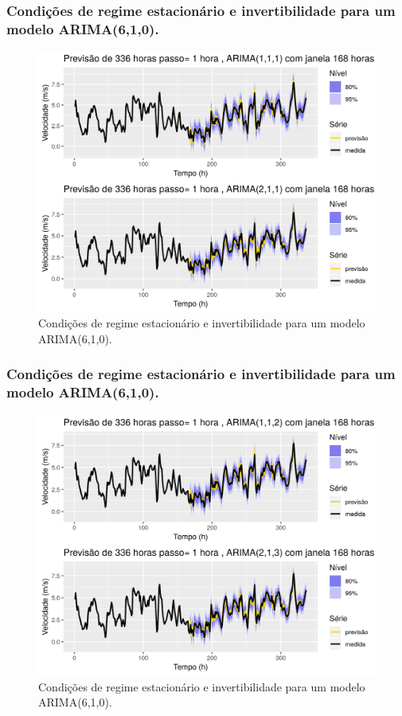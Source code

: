 \documentclass{beamer}
\begin{document}
\begin{frame}
	\frametitle{Condições de regime estacionário e invertibilidade para um modelo ARIMA(6,1,0).}
	\begin{figure}
		\centering
		\includegraphics[width=\textwidth]{arima12}
		\caption{Condições de regime estacionário e invertibilidade para um modelo ARIMA(6,1,0).}
	\end{figure}
\end{frame}

\begin{frame}
	\frametitle{Condições de regime estacionário e invertibilidade para um modelo ARIMA(6,1,0).}
	\begin{figure}
		\centering
		\includegraphics[width=\textwidth]{arima34}
		\caption{Condições de regime estacionário e invertibilidade para um modelo ARIMA(6,1,0).}
	\end{figure}
\end{frame}
\end{document}
